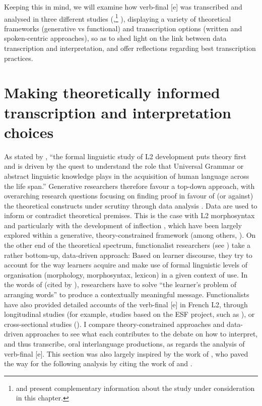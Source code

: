 \documentclass[output=paper,colorlinks,citecolor=brown,modfonts,nonflat]{../langscibook}
\begin{document}
Keeping this in mind, we will examine how verb-final [e] was transcribed and analysed in three different studies (\citealt{Herschensohn2001,Prévost2007French,Prévost2007English},\footnote{{\citet{Prévost2007French} and \citet{Prévost2007English} present complementary information about the study under consideration in this chapter.}} \citealt{Granget2015}), displaying a variety of theoretical frameworks (generative vs functional) and transcription options (written and spoken-centric approaches), so as to shed light on the link between data transcription and interpretation, and offer reflections regarding best transcription practices.

\section{\textbf{Making theoretically informed transcription and interpretation choices}}%

As stated by \citet[186]{Ortega2014trying}, “the formal linguistic study of L2 development puts theory first and is driven by the quest to understand the role that Universal Grammar or abstract linguistic knowledge plays in the acquisition of human language across the life span.” Generative researchers therefore favour a top-down approach, with overarching research questions focusing on finding proof in favour of (or against) the theoretical constructs under scrutiny through data analysis \citep{Lardiere2012}. Data are used to inform or contradict theoretical premises. This is the case with L2 morphosyntax and particularly with the development of inflection \citep{Herschensohn2001}, which have been largely explored within a generative, theory-constrained framework (among others, \citealt{PrévostWhite2000,Prévost2007English,Herschensohn2001,Hawkins2004}). On the other end of the theoretical spectrum, functionalist researchers (see \citealt{LenartPerdue2004}) take a rather bottom-up, data-driven approach: Based on learner discourse, they try to account for the way learners acquire and make use of formal linguistic levels of organisation (morphology, morphosyntax, lexicon) in a given context of use. In the words of \citet{KleinPerdue1989} (cited by \citealt{LenartPerdue2004}), researchers have to solve “the learner’s problem of arranging words” to produce a contextually meaningful message. Functionalists have also provided detailed accounts of the verb-final [e] in French L2, through longitudinal studies (for example, studies based on the ESF project, such as \citealt{ColetteEtAl1995,Véronique2004}), or cross-sectional studies (\citealt{BartningSchlyter2004,Granget2015}). I compare theory-constrained approaches and data-driven approaches to see what each contributes to the debate on how to interpret, and thus transcribe, oral interlanguage productions, as regards the analysis of verb-final [e]. This section was also largely inspired by the work of \citet{Granget2015}, who paved the way for the following analysis by citing the work of \citet{Herschensohn2001} and \citet{Prévost2007French}.
\end{document}
